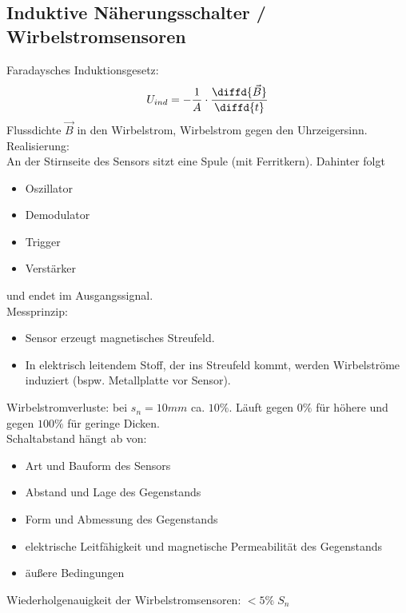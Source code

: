 \subsection{Induktive Näherungsschalter / Wirbelstromsensoren}
Faradaysches Induktionsgesetz: 
$$U_{ind}=-\frac{1}{A}\cdot \frac{\diffd{\vec{B}}}{\diffd{t}}$$
Flussdichte $\vec{B}$ in den Wirbelstrom, Wirbelstrom gegen den Uhrzeigersinn.\\
Realisierung:\\
An der Stirnseite des Sensors sitzt eine Spule (mit Ferritkern). Dahinter folgt
\begin{itemize}
\item Oszillator
\item Demodulator
\item Trigger
\item Verstärker
\end{itemize}
und endet im Ausgangssignal.\\
Messprinzip:
\begin{itemize}
\item Sensor erzeugt magnetisches Streufeld.
\item In elektrisch leitendem Stoff, der ins Streufeld kommt, werden Wirbelströme induziert (bspw. Metallplatte vor Sensor).
\end{itemize}
Wirbelstromverluste: bei $s_n=10\unit{mm}$ ca. $10\%$. Läuft gegen $0\%$ für höhere und gegen $100\%$ für geringe Dicken.\\
Schaltabstand hängt ab von:
\begin{itemize}
\item Art und Bauform des Sensors
\item Abstand und Lage des Gegenstands
\item Form und Abmessung des Gegenstands
\item elektrische Leitfähigkeit und magnetische Permeabilität des Gegenstands
\item äußere Bedingungen
\end{itemize}
Wiederholgenauigkeit der Wirbelstromsensoren: $<5\%\;S_n$
